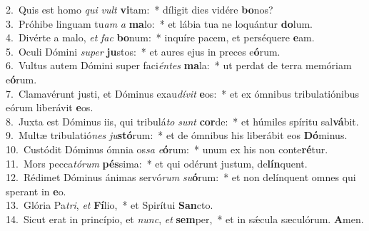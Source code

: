 {2.~}Quis est homo \textit{qui} \textit{vult} \textbf{vi}tam:~* díligit dies vidére \textbf{bo}nos?\\
{3.~}Próhibe linguam tu\textit{am} \textit{a} \textbf{ma}lo:~* et lábia tua ne loquántur \textbf{do}lum.\\
{4.~}Divérte a malo, \textit{et} \textit{fac} \textbf{bo}num:~* inquíre pacem, et perséquere \textbf{e}am.\\
{5.~}Oculi Dómini \textit{su}\textit{per} \textbf{ju}stos:~* et aures ejus in preces e\textbf{ó}rum.\\
{6.~}Vultus autem Dómini super faci\textit{én}\textit{tes} \textbf{ma}la:~* ut perdat de terra memóriam e\textbf{ó}rum.\\
{7.~}Clamavérunt justi, et Dóminus exau\textit{dí}\textit{vit} \textbf{e}os:~* et ex ómnibus tribulatiónibus eórum liberávit \textbf{e}os.\\
{8.~}Juxta est Dóminus iis, qui tribulá\textit{to} \textit{sunt} \textbf{cor}de:~* et húmiles spíritu sal\textbf{vá}bit.\\
{9.~}Multæ tribulatió\textit{nes} \textit{ju}\textbf{stó}rum:~* et de ómnibus his liberábit eos \textbf{Dó}minus.\\
{10.~}Custódit Dóminus ómnia os\textit{sa} \textit{e}\textbf{ó}rum:~* unum ex his non conte\textbf{ré}tur.\\
{11.~}Mors pecca\textit{tó}\textit{rum} \textbf{pés}sima:~* et qui odérunt justum, de\textbf{lín}quent.\\
{12.~}Rédimet Dóminus ánimas servó\textit{rum} \textit{su}\textbf{ó}rum:~* et non delínquent omnes qui sperant in \textbf{e}o.\\
{13.~}Glória Pa\textit{tri}, \textit{et} \textbf{Fí}lio,~* et Spirítui \textbf{San}cto.\\
{14.~}Sicut erat in princípio, et \textit{nunc}, \textit{et} \textbf{sem}per,~* et in sǽcula sæculórum. \textbf{A}men.\\
